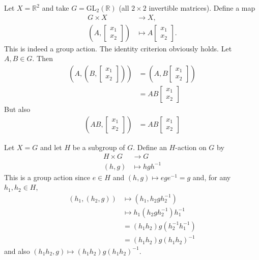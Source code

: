 \begin{example}
	Let $X=\mathbb R^2$ and take $G=\text{GL}_2(\mathbb R)$ (all $2\times 2$ invertible matrices). Define a map
	\begin{align*}
		G\times X&\to X,\\
		\left(A,\begin{bmatrix}
			x_1 \\ x_2
		\end{bmatrix}\right)&\mapsto A\begin{bmatrix}
			x_1 \\ x_2
		\end{bmatrix}.
	\end{align*}
	This is indeed a group action. The identity criterion obviously holds. Let $A,B\in G$. Then
	\begin{align*}
		\left(A,\left(B,\begin{bmatrix}
			x_1 \\ x_2
		\end{bmatrix}\right)\right)&=\left(A,B\begin{bmatrix}
			x_1 \\ x_2
		\end{bmatrix}\right)\\
		&=AB\begin{bmatrix}
			x_1 \\ x_2
		\end{bmatrix}
	\end{align*}
	But also
	\begin{align*}
		\left(AB,\begin{bmatrix}
			x_1 \\ x_2
		\end{bmatrix}\right)&=AB\begin{bmatrix}
			x_1 \\ x_2
		\end{bmatrix}
	\end{align*}
\end{example}

\begin{example}
	Let $X=G$ and let $H$ be a subgroup of $G$. Define an $H$-action on $G$ by
	\begin{align*}
		H\times G&\to G\\
		(h,g)&\mapsto hgh^{-1}
	\end{align*}
	This is a group action since $e\in H$ and $(h,g)\mapsto ege^{-1}=g$ and, for any $h_1,h_2\in H$,
	\begin{align*}
		(h_1,(h_2,g))&\mapsto (h_1,h_2gh_2^{-1})\\
		&\mapsto h_1(h_2gh_2^{-1})h_1^{-1}\\
		&=(h_1h_2)g(h_2^{-1}h_1^{-1})\\
		&=(h_1h_2)g(h_1h_2)^{-1}
	\end{align*}
	and also $(h_1h_2,g)\mapsto (h_1h_2)g(h_1h_2)^{-1}$.
\end{example}

